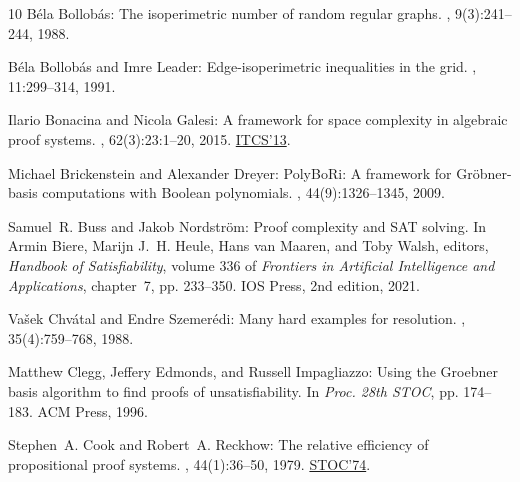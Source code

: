 \documentclass[11pt]{article}
\numberwithin{equation}{section}
\theoremstyle{definition}
\theoremstyle{plain}
\begin{document}
\begin{thebibliography}{10}
{\sc B{\'e}la Bollob\'{a}s}: The isoperimetric number of random regular graphs.
, 9(3):241--244, 1988.
\newblock [\epfmtdoi{10.1016/S0195-6698(88)80014-3}]

{\sc B\'{e}la Bollob\'{a}s and Imre Leader}: Edge-isoperimetric inequalities in
  the grid.
, 11:299--314, 1991.
\newblock [\epfmtdoi{10.1007/BF01275667}]

{\sc Ilario Bonacina and Nicola Galesi}: A framework for space complexity in
  algebraic proof systems.
, 62(3):23:1--20, 2015.
\newblock \prelim \href{https://doi.org/10.1145/2422436.2422486}{ITCS'13}.
\newblock [\epfmtdoi{10.1145/2699438}]

{\sc Michael Brickenstein and Alexander Dreyer}: {PolyBoRi}: A framework for
  {G}r\"obner-basis computations with {B}oolean polynomials.
, 44(9):1326--1345, 2009.

{\sc Samuel~R. Buss and Jakob Nordstr\"om}: Proof complexity and {SAT} solving.
\newblock In {\sc Armin Biere, Marijn J.~H. Heule, Hans van Maaren, and Toby
  Walsh}, editors, {\em Handbook of Satisfiability}, volume 336 of {\em
  Frontiers in Artificial Intelligence and Applications}, chapter~7, pp.
  233--350. IOS Press, 2nd edition, 2021.

{\sc Va{\v{s}}ek Chv{\'a}tal and Endre Szemer{\'e}di}: Many hard examples for
  resolution.
, 35(4):759--768, 1988.
\newblock [\epfmtdoi{10.1145/48014.48016}]

{\sc Matthew Clegg, Jeffery Edmonds, and Russell Impagliazzo}: Using the
  {Groebner} basis algorithm to find proofs of unsatisfiability.
\newblock In {\em Proc. 28th STOC}, pp. 174--183. ACM Press, 1996.
\newblock [\epfmtdoi{10.1145/237814.237860}]

{\sc Stephen~A. Cook and Robert~A. Reckhow}: The relative efficiency of
  propositional proof systems.
, 44(1):36--50, 1979.
\newblock \prelim \href{https://dl.acm.org/doi/10.1145/800119.803893}{STOC'74}.
\newblock [\epfmtdoi{10.2307/2273702}]


\end{thebibliography}
\end{document}
